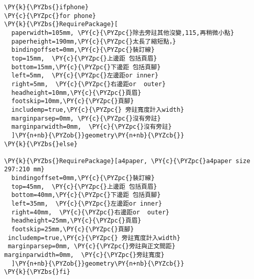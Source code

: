 \begin{Verbatim}[commandchars=\\\{\}]
\PY{k}{\PYZbs{}ifphone}
\PY{c}{\PYZpc{}for phone}
\PY{k}{\PYZbs{}RequirePackage}[
  paperwidth=105mm, \PY{c}{\PYZpc{}除去旁註其他沒變,115,再稍微小點}
  paperheight=190mm,\PY{c}{\PYZpc{}太長了縮短點，}
  bindingoffset=0mm,\PY{c}{\PYZpc{}裝訂線}
  top=15mm,  \PY{c}{\PYZpc{}上邊距 包括頁眉}
  bottom=15mm,\PY{c}{\PYZpc{}下邊距 包括頁腳}
  left=5mm,  \PY{c}{\PYZpc{}左邊距or inner}
  right=5mm,  \PY{c}{\PYZpc{}右邊距or  outer}
  headheight=10mm,\PY{c}{\PYZpc{}頁眉}
  footskip=10mm,\PY{c}{\PYZpc{}頁腳}
  includemp=true,\PY{c}{\PYZpc{} 旁註寬度計入width}
  marginparsep=0mm, \PY{c}{\PYZpc{}沒有旁註}
  marginparwidth=0mm,  \PY{c}{\PYZpc{}沒有旁註}
  ]\PY{n+nb}{\PYZob{}}geometry\PY{n+nb}{\PYZcb{}}
\PY{k}{\PYZbs{}else}

\PY{k}{\PYZbs{}RequirePackage}[a4paper, \PY{c}{\PYZpc{}a4paper size 297:210 mm}
  bindingoffset=0mm,\PY{c}{\PYZpc{}裝訂線}
  top=45mm,  \PY{c}{\PYZpc{}上邊距 包括頁眉}
  bottom=40mm,\PY{c}{\PYZpc{}下邊距 包括頁腳}
  left=35mm,  \PY{c}{\PYZpc{}左邊距or inner}
  right=40mm,  \PY{c}{\PYZpc{}右邊距or  outer}
  headheight=25mm,\PY{c}{\PYZpc{}頁眉}
  footskip=25mm,\PY{c}{\PYZpc{}頁腳}
 includemp=true,\PY{c}{\PYZpc{} 旁註寬度計入width}
 marginparsep=0mm, \PY{c}{\PYZpc{}旁註與正文間距}
marginparwidth=0mm,  \PY{c}{\PYZpc{}旁註寬度}
  ]\PY{n+nb}{\PYZob{}}geometry\PY{n+nb}{\PYZcb{}}
\PY{k}{\PYZbs{}fi}
\end{Verbatim}
